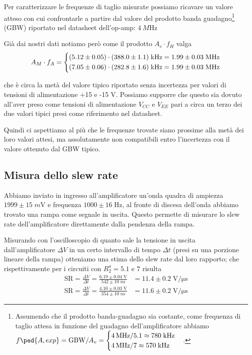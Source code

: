 \documentclass[10pt,a4paper]{article}
\begin{document}
Per caratterizzare le frequenze di taglio misurate possiamo ricavare un valore
atteso con cui confrontarle a partire dal valore del prodotto banda
guadagno\footnote{Assumendo che il prodotto banda-guadagno sia costante,
come frequenza di taglio attesa in funzione del guadagno dell'amplificatore
abbiamo
$f\ped{A, exp} = \mathrm{GBW}/A_v =
\begin{cases}
\SI{4}{M\Hz} / 5.1 \approx 780 \; \si{k\Hz} \\
\SI{4}{M\Hz} / 7 \approx 570 \; \si{k\Hz}
\end{cases}$.}
(GBW) riportato nel datasheet dell'op-amp: $\SI{4}{M\Hz}$

Già dai nostri dati notiamo però come il prodotto $A_v \cdot f_H$ valga
\[
A_M \cdot f_A = 
\begin{dcases}
(5.12 \pm 0.05) \cdot (388.0 \pm 1.1) \; \si{k\Hz} =
1.99 \pm 0.03 \; \si{M\Hz} \\
%
(7.05 \pm 0.06) \cdot (282.8 \pm 1.6) \; \si{k\Hz} =
1.99 \pm 0.03 \; \si{M\Hz} \\
\end{dcases}
\]

che è circa la metà del valore tipico riportato senza incertezza per valori
di tensioni di alimentazione +15 e -15 V. Possiamo supporre che questo sia
dovuto all'aver preso come tensioni di alimentazione $V_{CC}$ e $V_{EE}$
pari a circa un terzo dei due valori tipici presi come riferimento nel
datasheet.

Quindi ci aspettiamo al più che le frequenze trovate siano prossime alla
metà dei loro valori attesi, ma assolutamente non compatibili entro
l'incertezza con il valore ottenuto dal GBW tipico.

\subsection{Misura dello slew rate}
Abbiamo inviato in ingresso all'amplificatore un'onda quadra di ampiezza
$1999 \pm 15 \; \si{m\V}$ e frequenza $1000 \pm 16 \; \si{\Hz}$, al fronte di
discesa dell'onda abbiamo trovato una rampa come segnale in uscita. Questo
permette di misurare lo slew rate dell'amplificatore direttamente dalla
pendenza della rampa.

Misurando con l'oscilloscopio di quanto sale la tensione in uscita
dall'amplificatore $\Delta V$ in un certo intervallo di tempo $\Delta t$
(presi su una porzione lineare della rampa) otteniamo una stima dello slew
rate dal loro rapporto; che rispettivamente per i circuiti con $R_2^a = 5.1$
e $7$ risulta
\begin{align*}
\mathrm{SR} = \frac{\Delta V}{\Delta t} =
\frac{6.19 \pm 0.04 \; \si{\V}}{542 \pm 10 \; \si{n\s}}
&= 11.4 \pm 0.2 \; \si{\V/\micro\s} \\
\mathrm{SR} = \frac{\Delta V}{\Delta t} =
\frac{4.10 \pm 0.03 \; \si{\V}}{354 \pm 10 \; \si{n\s}}
&= 11.6 \pm 0.2 \; \si{\V/\micro\s}  
\end{align*}
\end{document}
